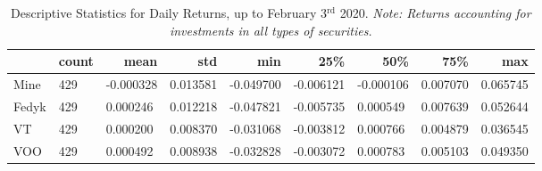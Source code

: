 \begin{appendices}
\begin{table}[ht]
\centering
\caption{Descriptive Statistics for Daily Returns, up to February 3$^\text{rd}$ 2020. 
\newline \footnotesize{\textit{Note: Returns accounting for investments in all types of securities.}}}
\begin{adjustbox}{width=\textwidth}
    \begin{tabular}{@{}lllllllll@{}}
    \toprule
    \multicolumn{1}{r}{\textbf{}}       & \multicolumn{1}{r}{\textbf{count}} & \multicolumn{1}{r}{\textbf{mean}} & \multicolumn{1}{r}{\textbf{std}} & \multicolumn{1}{r}{\textbf{min}} & \multicolumn{1}{r}{\textbf{25\%}} & \multicolumn{1}{r}{\textbf{50\%}} & \multicolumn{1}{r}{\textbf{75\%}} & \multicolumn{1}{r}{\textbf{max}} \\ \midrule
    Mine  & 429                                & -0.000328                         & 0.013581                         & -0.049700                        & -0.006121                         & -0.000106                         & 0.007070                          & 0.065745                         \\
    Fedyk & 429                                & 0.000246                          & 0.012218                         & -0.047821                        & -0.005735                         & 0.000549                          & 0.007639                          & 0.052644                         \\
    VT    & 429                                & 0.000200                          & 0.008370                         & -0.031068                        & -0.003812                         & 0.000766                          & 0.004879                          & 0.036545                         \\
    VOO   & 429                                & 0.000492                          & 0.008938                         & -0.032828                        & -0.003072                         & 0.000783                          & 0.005103                          & 0.049350                         \\
        \end{tabular}
\end{adjustbox}
\label{tab:returns_st_before}
\end{table}
    

\end{appendices}
